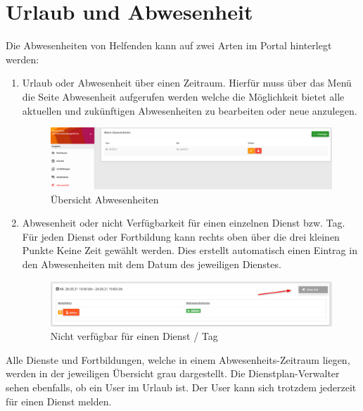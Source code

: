 \chapter{Urlaub und Abwesenheit}
\label{cha:holidays}

Die Abwesenheiten von Helfenden kann auf zwei Arten im Portal hinterlegt werden:
\begin{enumerate}
	\item Urlaub oder Abwesenheit über einen Zeitraum. Hierfür muss über das Menü  die Seite \glqq Abwesenheit\grqq{} aufgerufen werden welche die Möglichkeit bietet alle aktuellen und zukünftigen Abwesenheiten zu bearbeiten oder neue anzulegen.
	
	\begin{figure}[h]
		\begin{addmargin}{-0.2\linewidth}
			\centering 
			\includegraphics[width=15cm]{Bilder/view_holidays.png}
		\end{addmargin} 
		\caption[Urlaub und Abwesenheit]{Übersicht Abwesenheiten}
		\label{fig:view_holidays}
	\end{figure}
	
	\item Abwesenheit oder nicht Verfügbarkeit für einen einzelnen Dienst bzw. Tag. Für jeden Dienst oder Fortbildung kann rechts oben über die drei kleinen Punkte \glqq Keine Zeit\grqq{} gewählt werden. Dies erstellt automatisch einen Eintrag in den Abwesenheiten mit dem Datum des jeweiligen Dienstes.
	
	\begin{figure}[h]
		\begin{addmargin}{-0.2\linewidth}
			\centering 
			\includegraphics[width=15cm]{Bilder/view_service_holiday.png}
		\end{addmargin} 
		\caption[Abwesenheit]{Nicht verfügbar für einen Dienst / Tag}
		\label{fig:view_service_holiday}
	\end{figure}
\end{enumerate}


Alle Dienste und Fortbildungen, welche in einem Abwesenheits-Zeitraum liegen, werden in der jeweiligen Übersicht grau dargestellt. Die Dienstplan-Verwalter sehen ebenfalls, ob ein User im Urlaub ist. Der User kann sich trotzdem jederzeit für einen Dienst melden. 